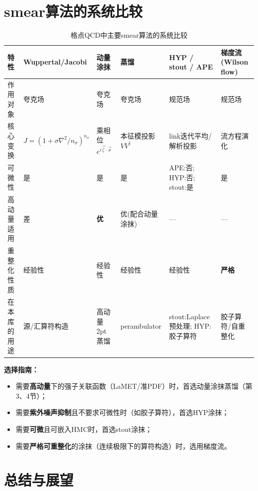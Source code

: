 \documentclass[12pt,a4paper]{ctexart}
\theoremstyle{definition}
\begin{document}
\section{smear算法的系统比较}

\begin{table}[H]
\centering
\caption{格点QCD中主要smear算法的系统比较}
\label{tab:comparison}
\small
\setlength{\tabcolsep}{4pt}
\begin{tabular}{p{1.9cm}p{2.5cm}p{2.2cm}p{2.2cm}p{3.0cm}p{2.6cm}}
\toprule
特性 & Wuppertal/Jacobi & 动量涂抹 & 蒸馏 & HYP / stout / APE & 梯度流(Wilson flow) \\
\midrule
作用对象 & 夸克场 & 夸克场 & 夸克场 & 规范场 & 规范场 \\
核心变换 & $J=(1+\sigma\nabla^2/n_\sigma)^{n_\sigma}$ & 乘相位$e^{i\vec{\zeta}\cdot\vec{x}}$ & 本征模投影$VV^\dagger$ & link迭代平均/解析投影 & 流方程演化 \\
可微性 & 是 & 是 & 是 & APE:否; HYP:否; stout:是 & 是 \\
高动量适用 & 差 & \textbf{优} & 优(配合动量涂抹) & --- & --- \\
重整化性质 & 经验性 & 经验性 & 经验性 & 经验性 & \textbf{严格} \\
在本库的用途 & 源/汇算符构造 & 高动量2pt蒸馏 & perambulator & stout:Laplace预处理; HYP:胶子算符 & 胶子算符/自重整化 \\
\bottomrule
\end{tabular}
\end{table}

\textbf{选择指南：}
\begin{itemize}
    \item 需要\textbf{高动量}下的强子关联函数（LaMET/准PDF）时，首选动量涂抹蒸馏（第3、4节）\cite{Bali2016,Egerer2021a}；
    \item 需要\textbf{紫外噪声抑制}且不要求可微性时（如胶子算符），首选HYP涂抹\cite{Chen2025gluon}；
    \item 需要\textbf{可微}且可嵌入HMC时，首选stout涂抹\cite{Morningstar2004}；
    \item 需要\textbf{严格可重整化}的涂抹（连续极限下的算符构造）时，选用梯度流\cite{LuscherWeisz2011}。
\end{itemize}

\section{总结与展望}
\end{document}
